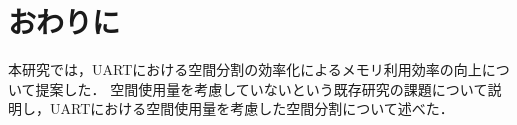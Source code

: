 \chapter{おわりに}

本研究では，UARTにおける空間分割の効率化によるメモリ利用効率の向上について提案した．
空間使用量を考慮していないという既存研究の課題について説明し，UARTにおける空間使用量を考慮した空間分割について述べた．
